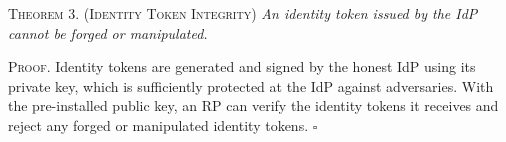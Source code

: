 
\newc
\vspace{3mm}
\noindent\textsc{Theorem 3. (Identity Token Integrity)} {\em An identity token issued by the IdP cannot be forged or manipulated.}



\vspace{0.75mm}
\noindent \textsc{Proof.} Identity tokens are generated and signed by the honest IdP using its private key, which is sufficiently protected at the IdP against adversaries.
With the pre-installed public key, an RP can verify the identity tokens it receives and reject any forged or manipulated identity tokens. \hfill $\square$




